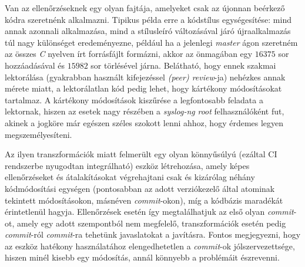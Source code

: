 Van az ellenőrzéseknek egy olyan fajtája, amelyeket csak az újonnan beérkező kódra szeretnénk
alkalmazni. Tipikus példa erre a kódstílus egységesítése: mind annak azonnali alkalmazása, mind a 
stílusleíró változásával járó újraalkalmazás túl nagy különséget eredeményezne,
például ha a jelenlegi \emph{master} ágon szeretném az összes \emph{C} nyelven írt forrásfájlt
formázni, akkor az önmagában egy $16375$ sor hozzáadásával és $15982$ sor törlésével járna.
Belátható, hogy ennek szakmai lektorálása (gyakrabban használt kifejezéssel \emph{(peer) review}-ja)
nehézkes annak mérete miatt, a lektorálatlan kód pedig lehet, hogy kártékony módosításokat
tartalmaz.  A kártékony módosítások kiszűrése a legfontosabb feladata a lektornak, hiszen az esetek
nagy részében a \emph{syslog-ng} \emph{root} felhasználóként fut, akinek a jogköre már egészen
széles szokott lenni ahhoz, hogy érdemes legyen megszemélyesíteni.

Az ilyen transzformációk miatt felmerült egy olyan könnyűsúlyú (ezáltal CI rendszerbe nyugodtan
integrálható) eszköz létrehozása, amely képes ellenőrzéseket és átalakításokat végrehajtani csak és
kizárólag néhány kódmódosítási egységen (pontosabban az adott verziókezelő által atominak tekintett
módosításokon, másnéven \emph{commit}-okon), míg a kódbázis maradékát érintetlenül hagyja.
Ellenőrzések esetén így megtalálhatjuk az első olyan \emph{commit}-ot, amely egy adott szempontból
nem megfelelő, transzformációk esetén pedig \emph{commit}-ról \emph{commit}-ra tehetünk javaslatokat
a javításra. Fontos megjegyezni, hogy az eszköz hatékony használatához elengedhetetlen
a \emph{commit}-ok jólszervezettsége, hiszen minél kisebb egy módosítás, annál könnyebb
a problémáit észrevenni.


